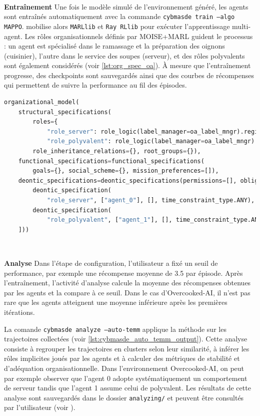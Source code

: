 \

\noindent
\textbf{Entraînement} \quad
Une fois le modèle simulé de l'environnement généré, les agents sont entraînés automatiquement avec la commande \texttt{cybmasde train --algo MAPPO}.  mobilise alors \texttt{MARLlib} et \texttt{Ray RLlib} pour exécuter l'apprentissage multi-agent. Les rôles organisationnels définis par MOISE+MARL guident le processus : un agent est spécialisé dans le ramassage et la préparation des oignons (cuisinier), l'autre dans le service des soupes (serveur), et des rôles polyvalents sont également considérés (voir \autoref{lst:org_spec_oa}). À mesure que l'entraînement progresse, des checkpoints sont sauvegardés ainsi que des courbes de récompenses qui permettent de suivre la performance au fil des épisodes.

\begin{lstlisting}[language=Python,basicstyle=\scriptsize, label={lst:org_spec_oa}, caption={Extrait du fichier de configuration organisationnelle pour Overcooked-AI}]
    organizational_model(
    structural_specifications(
        roles={
            "role_server": role_logic(label_manager=oa_label_mngr).registrer_script_rule(primary_fun),
            "role_polyvalent": role_logic(label_manager=oa_label_mngr).registrer_script_rule(secondary_fun)},
        role_inheritance_relations={}, root_groups={}),
    functional_specifications=functional_specifications(
        goals={}, social_scheme={}, mission_preferences=[]),
    deontic_specifications=deontic_specifications(permissions=[], obligations=[
        deontic_specification(
            "role_server", ["agent_0"], [], time_constraint_type.ANY),
        deontic_specification(
            "role_polyvalent", ["agent_1"], [], time_constraint_type.ANY)
    ]))
\end{lstlisting}

\

\textbf{Analyse} \quad
Dans l'étape de configuration, l'utilisateur a fixé un seuil de performance, par exemple une récompense moyenne de 3.5 par épisode. Après l'entraînement, l'activité d'analyse  calcule la moyenne des récompenses obtenues par les agents et la compare à ce seuil. Dans le cas d'Overcooked-AI, il n'est pas rare que les agents atteignent une moyenne inférieure après les premières itérations.

La comande \texttt{cybmasde analyze --auto-temm} applique la méthode  sur les trajectoires collectées (voir \autoref{lst:cybmasde_auto_temm_output}). Cette analyse consiste à regrouper les trajectoires en clusters selon leur similarité, à inférer les rôles implicites joués par les agents et à calculer des métriques de stabilité et d'adéquation organisationnelle. Dans l'environnement Overcooked-AI, on peut par exemple observer que l'agent 0 adopte systématiquement un comportement de serveur tandis que l'agent 1 assume celui de polyvalent. Les résultats de cette analyse sont sauvegardés dans le dossier \texttt{analyzing/} et peuvent être consultés par l'utilisateur (voir \autocite{lst:cybmasde_auto_temm_spec_output}).


